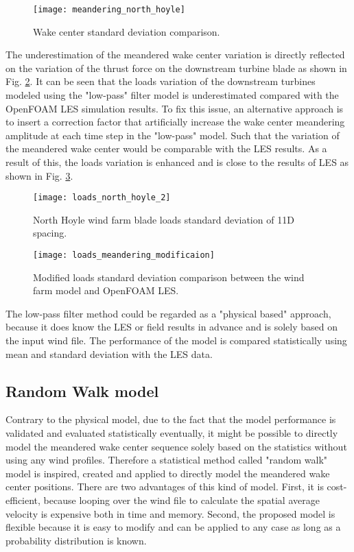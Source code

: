 \documentclass{umthesis}
\begin{document}
\begin{figure}
  \centering
  \texttt{[image: meandering\_north\_hoyle]}
  \caption{Wake center standard deviation comparison.}\label{fig:meandering_north_hoyle1}
\end{figure}

The underestimation of the meandered wake center variation is directly reflected on the variation of the thrust force on the downstream turbine blade as shown in Fig. \ref{fig:2_loads_north_hoyle_2}. It can be seen that the loads variation of the downstream turbines modeled using the "low-pass" filter model is underestimated compared with the OpenFOAM LES simulation results. To fix this issue, an alternative approach is to insert a correction factor that artificially increase the wake center meandering amplitude at each time step in the "low-pass" model. Such that the variation of the meandered wake center would be comparable with the LES results. As a result of this, the loads variation is enhanced and is close to the results of LES as shown in Fig. \ref{fig:1_loads_meandering_modificaion}.

\begin{figure}
  \centering
  \texttt{[image: loads\_north\_hoyle\_2]}
  \caption{North Hoyle wind farm blade loads standard deviation of 11D spacing.}\label{fig:2_loads_north_hoyle_2}
\end{figure}

\begin{figure}
  \centering
  \texttt{[image: loads\_meandering\_modificaion]}
  \caption{Modified loads standard deviation comparison between the wind farm model and OpenFOAM LES.}\label{fig:1_loads_meandering_modificaion}
\end{figure}

The low-pass filter method could be regarded as a "physical based" approach, because it does know the LES or field results in advance and is solely based on the input wind file. The performance of the model is compared statistically using mean and standard deviation with the LES data.

\subsection{Random Walk model}
Contrary to the physical model, due to the fact that the model performance is validated and evaluated statistically eventually, it might be possible to directly model the meandered wake center sequence solely based on the statistics without using any wind profiles. Therefore a statistical method called "random walk" model is inspired, created and applied to directly model the meandered wake center positions. There are two advantages of this kind of model. First, it is cost-efficient, because looping over the wind file to calculate the spatial average velocity is expensive both in time and memory. Second, the proposed model is flexible because it is easy to modify and can be applied to any case as long as a probability distribution is known. 
\end{document}
